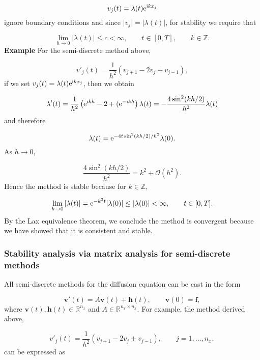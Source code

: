 \documentclass[12pt,landscape]{article}
\begin{document}
{\[
v_j(t) = \lambda(t){\rm e}^{{\rm i}kx_j}
\]
ignore boundary conditions and since $\vert v_j \vert = \vert\lambda(t) \vert$, for stability we require that

\[
\lim_{h \to 0}\left\vert \lambda(t)\right \vert \leq c < \infty, \qquad t \in [0, T], \qquad k \in \mathbb{Z}.
\]
\textbf{Example} For the semi-discrete method above,

\[
v'_j(t) = \frac{1}{h^2}\left(v_{j+1} - 2v_j + v_{j-1}   \right),
\]
if we set $v_j(t) = \lambda(t){\rm e}^{{\rm i}kx_j}$, then we obtain

\[
\lambda'(t) = \frac{1}{h^2}\left({\rm e}^{{\rm i}kh} - 2 +   ({\rm e}^{-{\rm i}kh} \right)\lambda(t) = -\frac{4\sin^2(kh/2)}{h^2}\lambda(t)
\]
and therefore

\[
\lambda(t) = {\rm e}^{-4t\sin^2(kh/2)/h^2}\lambda(0). 
\]
As $h \to 0$, 

\[
\frac{4\sin^2(kh/2)}{h^2} = k^2 + \mathcal{O}(h^2).
\]
Hence the method is stable because for $k \in \mathbb{Z}$,

\[
\lim_{h \to 0} \vert \lambda(t) \vert = {\rm e}^{-k^2t}\vert \lambda(0) \vert \leq  \vert \lambda(0) \vert < \infty, \qquad   t \in [0, T].
\]
By the Lax equivalence theorem, we conclude the method is convergent because we have showed that it is consistent and stable.

\subsubsection{Stability analysis via matrix analysis for semi-discrete methods}
All semi-discrete methods for the diffusion equation can be cast in the form

\[
\mathbf{v}'(t) = A\mathbf{v}(t) + \mathbf{h}(t), \qquad \mathbf{v}(0) = \mathbf{f}, 
\]
where $\mathbf{v}(t), \mathbf{h}(t) \in \mathbb{R}^{n_x}$ and  $A \in \mathbb{R}^{n_x \times n_x}$.  For example, the method derived above,

\[
v'_j(t) = \frac{1}{h^2}\left(v_{j+1} - 2v_j + v_{j-1}   \right), \qquad j  = 1, \ldots, n_x,
\]
can be expressed as

}
\end{document}
